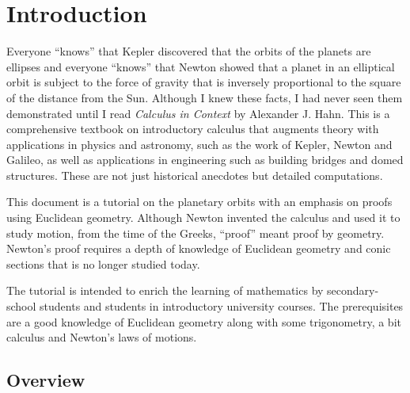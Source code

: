 \newpage

\tableofcontents

\newpage


\chapter{Introduction}

Everyone ``knows'' that Kepler discovered that the orbits of the planets are ellipses and everyone ``knows'' that Newton showed that a planet in an elliptical orbit is subject to the force of gravity that is inversely proportional to the square of the distance from the Sun. Although I knew these facts, I had never seen them demonstrated until I read \textit{Calculus in Context} \cite{hahn-cic} by Alexander J. Hahn. This is a comprehensive textbook on introductory calculus that augments theory with  applications in physics and astronomy, such as the work of Kepler, Newton and Galileo, as well as applications in engineering such as building bridges and domed structures. These are not just historical anecdotes but detailed computations.

This document is a tutorial on the planetary orbits with an emphasis on proofs using Euclidean geometry. Although Newton invented the calculus and used it to study motion, from the time of the Greeks, ``proof'' meant proof by geometry. Newton's proof requires a depth of knowledge of Euclidean geometry and conic sections that is no longer studied today.

The tutorial is intended to enrich the learning of mathematics by secondary-school students and students in introductory university courses. The prerequisites are a good knowledge of Euclidean geometry along with some trigonometry, a bit calculus and Newton's laws of motions.

\section*{Overview}

